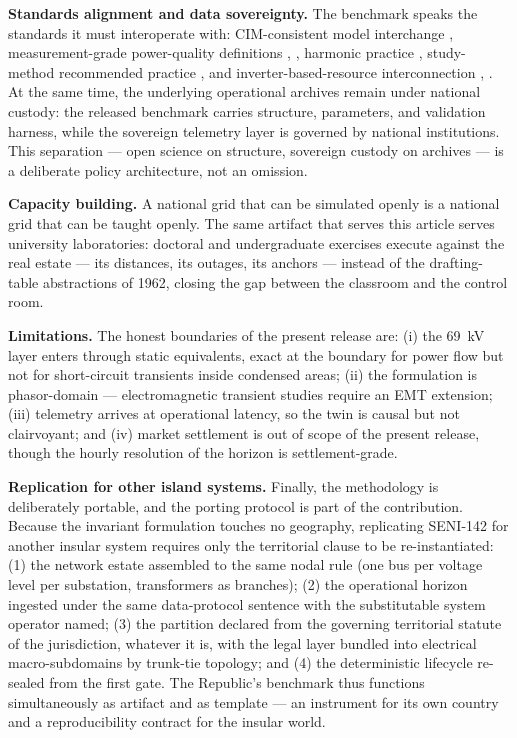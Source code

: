 \textbf{Standards alignment and data sovereignty.} The benchmark speaks the standards it must interoperate with: CIM-consistent model interchange \cite{iec61970}, measurement-grade power-quality definitions \cite{iec61000}, \cite{ieee1459}, harmonic practice \cite{ieee519}, study-method recommended practice \cite{ieee399}, and inverter-based-resource interconnection \cite{ieee2800}, \cite{ieee1547}. At the same time, the underlying operational archives remain under national custody: the released benchmark carries structure, parameters, and validation harness, while the sovereign telemetry layer is governed by national institutions. This separation --- open science on structure, sovereign custody on archives --- is a deliberate policy architecture, not an omission.

\textbf{Capacity building.} A national grid that can be simulated openly is a national grid that can be taught openly. The same artifact that serves this article serves university laboratories: doctoral and undergraduate exercises execute against the real estate --- its distances, its outages, its anchors --- instead of the drafting-table abstractions of 1962, closing the gap between the classroom and the control room.

\textbf{Limitations.} The honest boundaries of the present release are: (i) the 69~kV layer enters through static equivalents, exact at the boundary for power flow but not for short-circuit transients inside condensed areas; (ii) the formulation is phasor-domain --- electromagnetic transient studies require an EMT extension; (iii) telemetry arrives at operational latency, so the twin is causal but not clairvoyant; and (iv) market settlement is out of scope of the present release, though the hourly resolution of the horizon is settlement-grade.

\textbf{Replication for other island systems.} Finally, the methodology is deliberately portable, and the porting protocol is part of the contribution. Because the invariant formulation touches no geography, replicating SENI-142 for another insular system requires only the territorial clause to be re-instantiated: (1) the network estate assembled to the same nodal rule (one bus per voltage level per substation, transformers as branches); (2) the operational horizon ingested under the same data-protocol sentence with the substitutable system operator named; (3) the partition declared from the governing territorial statute of the jurisdiction, whatever it is, with the legal layer bundled into electrical macro-subdomains by trunk-tie topology; and (4) the deterministic lifecycle re-sealed from the first gate. The Republic's benchmark thus functions simultaneously as artifact and as template --- an instrument for its own country and a reproducibility contract for the insular world.

